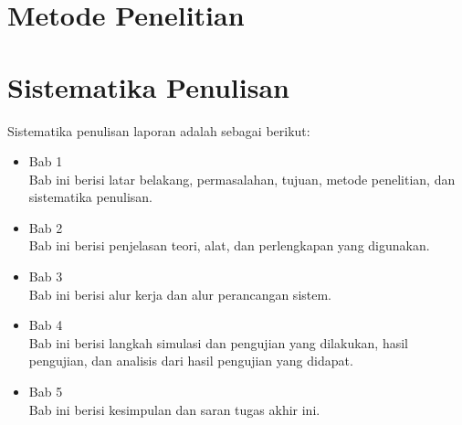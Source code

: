 \section{Metode Penelitian}

\section{Sistematika Penulisan}

Sistematika penulisan laporan adalah sebagai berikut:
\begin{itemize}
	\item Bab 1 \babSatu \\
	Bab ini berisi latar belakang, permasalahan, tujuan, metode penelitian, dan sistematika penulisan.
	\item Bab 2 \babDua \\
	Bab ini berisi penjelasan teori, alat, dan perlengkapan yang digunakan.
	\item Bab 3 \babTiga \\
	Bab ini berisi alur kerja dan alur perancangan sistem.	
	\item Bab 4 \babEmpat \\
	Bab ini berisi langkah simulasi dan pengujian yang dilakukan, hasil pengujian, dan analisis dari hasil pengujian yang didapat.
	\item Bab 5 \babLima \\
	Bab ini berisi kesimpulan dan saran tugas akhir ini.
\end{itemize}


